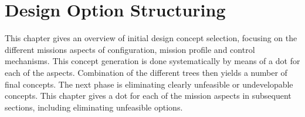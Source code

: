 \section{Design Option Structuring} \label{ch:design}
This chapter gives an overview of initial design concept selection, focusing on the different missions aspects of configuration, mission profile and control mechanisms. This concept generation is done systematically by means of a \gls{dot} for each of the aspects. Combination of the different trees then yields a number of final concepts. The next phase is eliminating clearly unfeasible or undevelopable concepts. This chapter gives a \gls{dot} for each of the mission aspects in subsequent sections, including eliminating unfeasible options.

%
%

